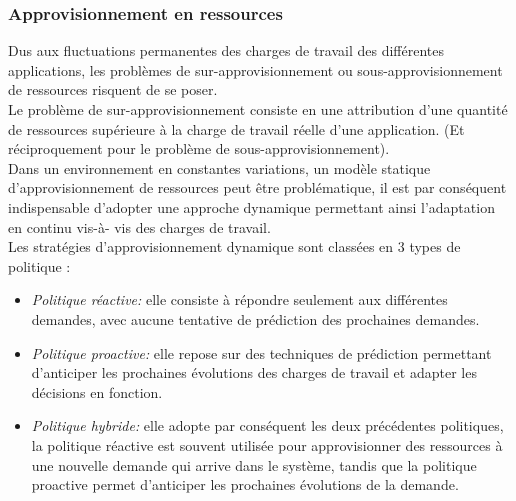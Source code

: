 \subsubsection{Approvisionnement en ressources}
Dus aux fluctuations permanentes des charges de travail des différentes applications, les problèmes de sur-approvisionnement ou sous-approvisionnement de  ressources risquent de se poser.\\
Le problème de sur-approvisionnement consiste en une attribution d'une quantité de ressources supérieure à la charge de travail réelle d'une application. (Et réciproquement pour le problème de sous-approvisionnement).\\
Dans un environnement en constantes variations,  un modèle statique d'approvisionnement de ressources peut être problématique, il est par conséquent indispensable d'adopter une approche dynamique permettant ainsi l'adaptation en continu vis-à- vis des charges de travail.\\ 
Les stratégies d'approvisionnement dynamique sont classées en 3 types de politique :
\begin{itemize}
  \item \emph{Politique réactive:} elle consiste à répondre seulement aux différentes demandes, avec aucune tentative de prédiction des prochaines demandes.
  \item \emph{Politique proactive:} elle repose sur des techniques de prédiction permettant d'anticiper les prochaines évolutions des charges de travail et adapter les décisions en fonction.
  \item \emph{Politique hybride:} elle adopte par conséquent les deux précédentes politiques,  la politique réactive est souvent utilisée pour approvisionner des ressources à une nouvelle demande qui arrive dans le système, tandis que la politique proactive permet d'anticiper les prochaines évolutions de la demande. 
\end{itemize}

